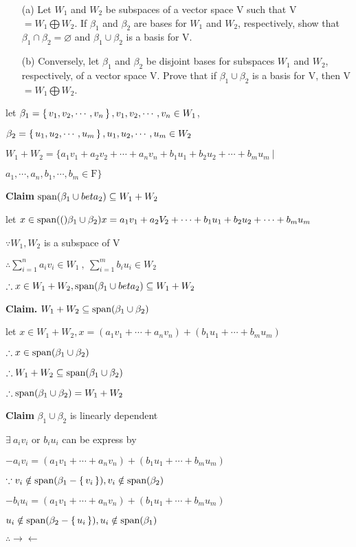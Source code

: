 \begin{enumerate}
	\item[(a)] Let $W_1$ and $W_2$ be subspaces of a vector space V such that V $= W_1 \bigoplus W_2$. If $\beta_{1}$ and $\beta_{2}$ are bases for $W_1$ and $W_2$, respectively, show that $\beta_1 \cap \beta_2 = \varnothing$ and $\beta_1 \cup \beta_2$ is a basis for V.
	\item[(b)] Conversely, let $\beta_1$ and $\beta_2$ be disjoint bases for subspaces $W_1$ and $W_2$, respectively, of a vector space V. Prove that if $\beta_1 \cup \beta_2$ is a basis for V, then V $= W_1 \bigoplus W_2$.
\end{enumerate}

\begin{tcolorbox}
	\begin{solution}
		let $\beta_1 = \left\{ \,v_1,v_2,\cdots,v_n \,\right\},v_1,v_2,\cdots,v_n \in W_1$,
		
		 $\beta_2 = \left\{ \,u_1,u_2,\cdots,u_m \,\right\},u_1,u_2,\cdots,u_m \in W_2$
		
		$W_1 + W_2 = \{a_1v_1+a_2v_2+\cdots+a_nv_n+b_1u_1+b_2u_2+\cdots+b_mu_m ~|~  $ 
		
		$a_1,\cdots,a_n,b_1,\cdots,b_m \in \mathrm{F}\} $
		
		\textbf{Claim} $\text{span($\beta_1 \cup beta_2$)} \subseteq W_1 + W_2$
		
		let $x \in \text{span($($)}\beta_1 \cup \beta_2) x = a_1v_1 + a_2V_2 + \cdots + b_1u_1 + b_2u_2 + \cdots + b_mu_m$
		
		$\because W_1,W_2$ is a subspace of V
		
		$\therefore \sum^{n}_{i=1}a_iv_i \in W_1~,~ \sum^{m}_{i=1}b_iu_i \in W_2$
		
		$\therefore x \in W_1 + W_2,\text{span($\beta_1 \cup beta_2$)} \subseteq W_1 + W_2$
		
		\textbf{Claim.} $W_1 + W_2 \subseteq \text{span($\beta_1 \cup \beta_2$)}$
		
		let $x \in W_1 + W_2, x = (a_1v_1 + \cdots + a_nv_n) + (b_1u_1 + \cdots  + b_mu_m)$
		
		$\therefore x \in \text{span($\beta_1 \cup \beta_2$)}$
		
		$\therefore W_1 + W_2 \subseteq \text{span($\beta_1 \cup \beta_2$)}$
		
		$\therefore \text{span($\beta_1 \cup \beta_2$)} = W_1 + W_2$

		\textbf{Claim} ${\beta_1 \cup \beta_2}$ is linearly dependent
		
		$\exists~a_iv_i$ or $b_iu_i$ can be express by
		
		$-a_iv_i = (a_1v_1+\cdots+a_nv_n)+(b_1u_1+\cdots+b_mu_m)$ 
		
		$\because v_i \notin \text{span($\beta_1-\left\{ \,v_i \,\right\}$)}, v_i \notin \text{span($\beta_2$)}$
		
		$-b_iu_i = (a_1v_1+\cdots+a_nv_n)+(b_1u_1+\cdots+b_mu_m)$ 
		
		$u_i \notin \text{span($\beta_2-\left\{ \,u_i \,\right\}$)}, u_i \notin \text{span($\beta_1$)}$
		
		$\therefore \rightarrow\leftarrow$
		
	\end{solution}
\end{tcolorbox}
